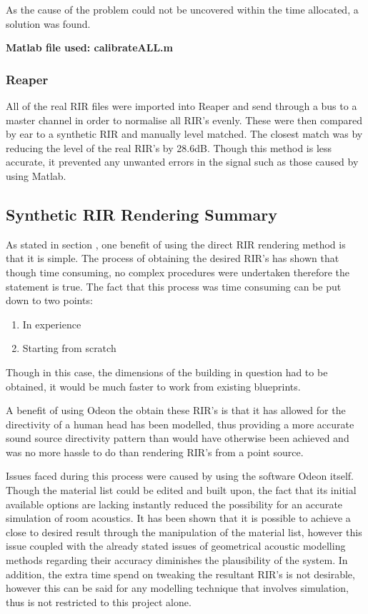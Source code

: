 \documentclass[../../main.tex]{subfiles}
\begin{document}
		As the cause of the problem could not be uncovered within the time allocated, a solution was found.

		\textbf{Matlab file used: calibrateALL.m}

		\subsubsection{Reaper}

			All of the real \ac{RIR} files were imported into Reaper and send through a bus to a master channel in order to normalise all \ac{RIR}'s evenly. These were then compared by ear to a synthetic \ac{RIR} and manually level matched. The closest match was by reducing the level of the real \ac{RIR}'s by 28.6dB. Though this method is less accurate, it prevented any unwanted errors in the signal such as those caused by using Matlab.

		\subsection{Synthetic RIR Rendering Summary}

			As stated in section , one benefit of using the direct \ac{RIR} rendering method is that it is simple. The process of obtaining the desired \ac{RIR}'s has shown that though time consuming, no complex procedures were undertaken therefore the statement is true. The fact that this process was time consuming can be put down to two points:
			\begin{enumerate}
				\item In experience
				\item Starting from scratch
			\end{enumerate}

			Though in this case, the dimensions of the building in question had to be obtained, it would be much faster to work from existing blueprints.

			A benefit of using Odeon the obtain these \ac{RIR}'s is that it has allowed for the directivity of a human head has been modelled, thus providing a more accurate sound source directivity pattern than would have otherwise been achieved and was no more hassle to do than rendering \ac{RIR}'s from a point source.
			

			Issues faced during this process were caused by using the software Odeon itself. Though the material list could be edited and built upon, the fact that its initial available options are lacking instantly reduced the possibility for an accurate simulation of room acoustics. It has been shown that it is possible to achieve a close to desired result through the manipulation of the material list, however this issue coupled with the already stated issues of geometrical acoustic modelling methods regarding their accuracy diminishes the plausibility of the system. In addition, the extra time spend on tweaking the resultant \ac{RIR}'s is not desirable, however this can be said for any modelling technique that involves simulation, thus is not restricted to this project alone.
\end{document}
